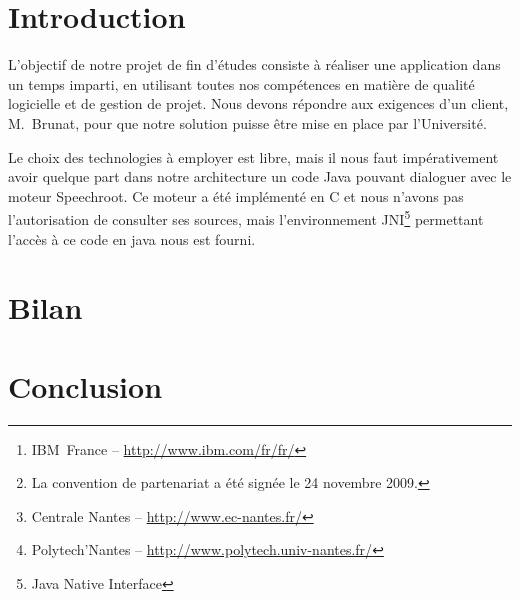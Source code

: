 \documentclass[a4paper,11pt]{report}
\begin{document}


\begin{abstract}
Le projet de fin d'études consiste en la mise en \oe{}uvre de compétences acquises au cours des deux années de Master.
Chaque groupe de quatre à six étudiants travaille sur un sujet de projet différent.
Le déroulement du projet doit respecter les étapes de création d'un véritable projet open-source et doit en conséquent tirer au maximum profit des différents outils de gestion de projet.

Le projet que nous avons choisi de réaliser a été proposé par l'entreprise IBM~France\footnote{IBM~France -- \url{http://www.ibm.com/fr/fr/}}.
Il s'agit du fruit d'un partenariat entre IBM et l'Université de Nantes\footnote{La convention de partenariat a été signée le 24 novembre 2009.} afin de faciliter la scolarisation des étudiants malentendants.
En effet, à l'aide d'un logiciel disposant d'un moteur de reconnaissance vocale (en l' occurrence le moteur ``Speechroot'' d'IBM), l'étudiant aurait accès au sous-titrage du discours de l'enseignant de manière immédiate.
Ce projet diffère légèrement des autres par le fait que nous devons travailler en collaboration avec des groupes d'étudiants de d'autres écoles.
L'équipe d'IBM, composée de Béatrice~Martin et de sa collègue Christel~Amato, technicienne ayant une très importante expérience dans le domaine de la reconnaissance vocale, se charge de la coordination entre les trois groupes d'étudiants (celui de Centrale\footnote{Centrale Nantes -- \url{http://www.ec-nantes.fr/}}, de Polytech'\footnote{Polytech'Nantes -- \url{http://www.polytech.univ-nantes.fr/}} et nous-mêmes) et Stéphane~Brunat du Relai Handicap.
\end{abstract}

\tableofcontents


\chapter*{Introduction}
L'objectif de notre projet de fin d'études consiste à réaliser une application dans un temps imparti, en utilisant toutes nos compétences en matière de qualité logicielle et de gestion de projet.
Nous devons répondre aux exigences d'un client, M.~Brunat, pour que notre solution puisse être mise en place par l'Université.

Le choix des technologies à employer est libre, mais il nous faut im\-pé\-ra\-ti\-ve\-ment avoir quelque part dans notre architecture un code Java pouvant dialoguer avec le moteur Speechroot.
Ce moteur a été implémenté en C et nous n'avons pas l'autorisation de consulter ses sources, mais l'environnement JNI\footnote{Java Native Interface} permettant l'accès à ce code en java nous est fourni.







\chapter{Bilan}

\chapter{Conclusion}


\end{document}
